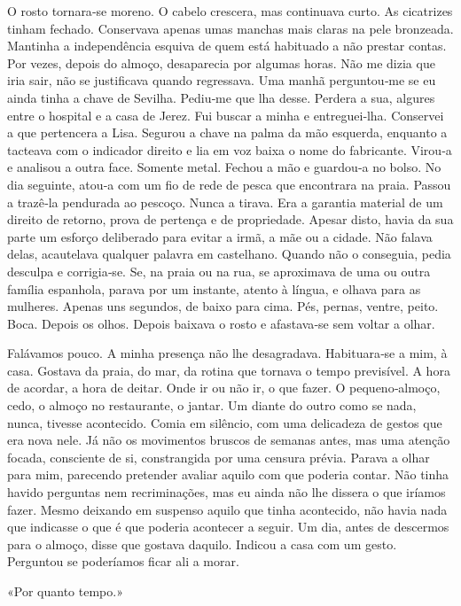 O rosto tornara­‑se moreno. O cabelo crescera, mas continuava curto. As
cicatrizes tinham fechado. Conservava apenas umas manchas mais claras na
pele bronzeada. Mantinha a independência esquiva de quem está habituado
a não prestar contas. Por vezes, depois do almoço, desaparecia por
algumas horas. Não me dizia que iria sair, não se justificava quando
regressava. Uma manhã perguntou­‑me se eu ainda tinha a chave de
Sevilha. Pediu­‑me que lha desse. Perdera a sua, algures entre o
hospital e a casa de Jerez. Fui buscar a minha e entreguei­‑lha.
Conservei a que pertencera a Lisa. Segurou a chave na palma da mão
esquerda, enquanto a tacteava com o indicador direito e lia em voz baixa
o nome do fabricante. Virou­‑a e analisou a outra face. Somente metal.
Fechou a mão e guardou­‑a no bolso. No dia seguinte, atou­‑a com um fio
de rede de pesca que encontrara na praia. Passou a trazê­‑la pendurada
ao pescoço. Nunca a tirava. Era a garantia material de um direito de
retorno, prova de pertença e de propriedade. Apesar disto, havia da sua
parte um esforço deliberado para evitar a irmã, a mãe ou a cidade. Não
falava delas, acautelava qualquer palavra em castelhano. Quando não o
conseguia, pedia desculpa e corrigia­‑se. Se, na praia ou na rua, se
aproximava de uma ou outra família espanhola, parava por um instante,
atento à língua, e olhava para as mulheres. Apenas uns segundos, de
baixo para cima. Pés, pernas, ventre, peito. Boca. Depois os olhos.
Depois baixava o rosto e afastava­‑se sem voltar a olhar.

Falávamos pouco. A minha presença não lhe desagradava. Habituara­‑se a
mim, à casa. Gostava da praia, do mar, da rotina que tornava o tempo
previsível. A hora de acordar, a hora de deitar. Onde ir ou não ir, o
que fazer. O pequeno­‑almoço, cedo, o almoço no restaurante, o jantar.
Um diante do outro como se nada, nunca, tivesse acontecido. Comia em
silêncio, com uma delicadeza de gestos que era nova nele. Já não os
movimentos bruscos de semanas antes, mas uma atenção focada, consciente
de si, constrangida por uma censura prévia. Parava a olhar para mim,
parecendo pretender avaliar aquilo com que poderia contar. Não tinha
havido perguntas nem recriminações, mas eu ainda não lhe dissera o que
iríamos fazer. Mesmo deixando em suspenso aquilo que tinha acontecido,
não havia nada que indicasse o que é que poderia acontecer a seguir. Um
dia, antes de descermos para o almoço, disse que gostava daquilo.
Indicou a casa com um gesto. Perguntou se poderíamos ficar ali a morar.

«Por quanto tempo.»

